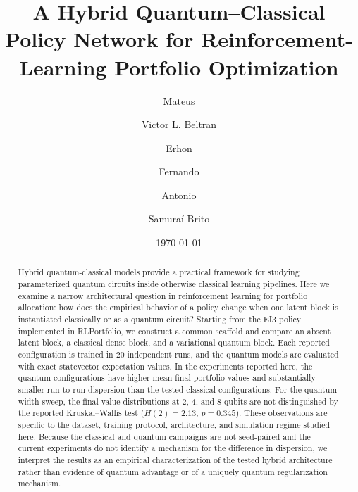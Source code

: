 \documentclass[aps,floatfix,superscriptaddress,twocolumn,tightenlines,amsmath,amssymb,nofootinbib,10pt,longbibliography,prl]{revtex4-2}
\begin{document}
\title{A Hybrid Quantum--Classical Policy Network for Reinforcement-Learning Portfolio Optimization}

\author{Mateus}

\author{Victor L. Beltran}

\author{Erhon}

\author{Fernando}

\author{Antonio }

\author{Samuraí Brito}

\date{\today}
\begin{abstract}
Hybrid quantum-classical models provide a practical framework for studying parameterized quantum circuits inside otherwise classical learning pipelines. Here we examine a narrow architectural question in reinforcement learning for portfolio allocation: how does the empirical behavior of a policy change when one latent block is instantiated classically or as a quantum circuit? Starting from the EI3 policy implemented in RLPortfolio, we construct a common scaffold and compare an absent latent block, a classical dense block, and a variational quantum block. Each reported configuration is trained in 20 independent runs, and the quantum models are evaluated with exact statevector expectation values. In the experiments reported here, the quantum configurations have higher mean final portfolio values and substantially smaller run-to-run dispersion than the tested classical configurations. For the quantum width sweep, the final-value distributions at 2, 4, and 8 qubits are not distinguished by the reported Kruskal--Wallis test ($H(2)=2.13$, $p=0.345$). These observations are specific to the dataset, training protocol, architecture, and simulation regime studied here. Because the classical and quantum campaigns are not seed-paired and the current experiments do not identify a mechanism for the difference in dispersion, we interpret the results as an empirical characterization of the tested hybrid architecture rather than evidence of quantum advantage or of a uniquely quantum regularization mechanism.
\end{abstract}
\maketitle

\end{document}
